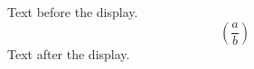 \documentclass{article}
\begin{document}
Text before the display.
\[
  \left( \frac{a}{b} \right)
\]
Text after the display.
\end{document}
